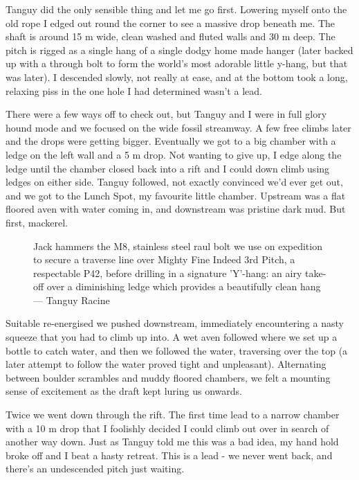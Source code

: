 Tanguy did the only sensible thing and let me go first. Lowering myself onto the old rope I edged out round the corner to see a massive drop beneath me. The shaft is around 15 m wide, clean washed and fluted walls and 30 m deep. The pitch is rigged as a single hang of a single dodgy home made hanger (later backed up with a through bolt to form the world’s most adorable little y-hang, but that was later). I descended slowly, not really at ease, and at the bottom took a long, relaxing piss in the one hole I had determined wasn’t a lead.
 
There were a few ways off to check out, but Tanguy and I were in full glory hound mode and we focused on the wide fossil streamway. A few free climbs later and the drops were getting bigger. Eventually we got to a big chamber with a ledge on the left wall and a 5 m drop. Not wanting to give up, I edge along the ledge until the chamber closed back into a rift and I could down climb using ledges on either side. Tanguy followed, not exactly convinced we’d ever get out, and we got to the Lunch Spot, my favourite little chamber. Upstream was a flat floored aven with water coming in, and downstream was pristine dark mud. But first, mackerel.
 
 
 \begin{figure}[t!]
\checkoddpage \ifoddpage \forcerectofloat \else \forceversofloat \fi
\centering
{}
\caption{Jack hammers the M8, stainless steel raul bolt we use on expedition to secure a traverse line over Mighty Fine Indeed 3rd Pitch, a respectable P42, before drilling in a signature 'Y'-hang: an airy take-off over a diminishing ledge which provides a beautifully clean hang --- Tanguy Racine  }
\label{bolt M8}
\end{figure}

Suitable re-energised we pushed downstream, immediately encountering a nasty squeeze that you had to climb up into. A wet aven followed where we set up a bottle to catch water, and then we followed the water, traversing over the top (a later attempt to follow the water proved tight and unpleasant). Alternating between boulder scrambles and muddy floored chambers, we felt a mounting sense of excitement as the draft kept luring us onwards.
 
Twice we went down through the rift. The first time lead to a narrow chamber with a 10 m drop that I foolishly decided I could climb out over in search of another way down. Just as Tanguy told me this was a bad idea, my hand hold broke off and I beat a hasty retreat. This is a lead - we never went back, and there’s an undescended pitch just waiting.
 
